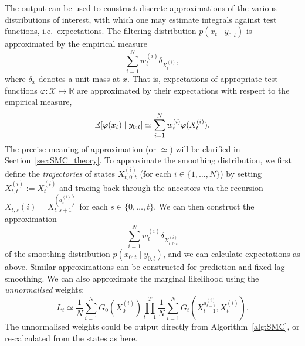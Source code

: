 The output can be used to construct discrete approximations of the various distributions of interest, with which one may estimate integrals against test functions, i.e.\ expectations.
The filtering distribution $p(x_t \mid y_{0:t})$ is approximated by the empirical measure
\begin{equation*}
\sum_{i=1}^N w_t^{(i)} \delta_{ X_t^{(i)} } ,
\end{equation*}
where $\delta_x$ denotes a unit mass at $x$.
That is, expectations of appropriate test functions $\varphi : \mathcal{X} \mapsto \mathbb{R}$ are approximated by their expectations with respect to the empirical measure,
\begin{equation*}
\mathbb{E}[ \varphi(x_t) \mid y_{0:t} ]
\simeq \sum_{i=1}^N w_t^{(i)} \varphi( X_t^{(i)} ) .
\end{equation*}
The precise meaning of approximation (or $\simeq$) will be clarified in Section~\ref{sec:SMC_theory}.
To approximate the smoothing distribution, we first define the \emph{trajectories} of states $X_{t,0:t}^{(i)}$ (for each $i \in \{1,\dots,N\}$) by setting $X_{t,t}^{(i)} := X_t^{(i)}$ and tracing back through the ancestors via the recursion $X_{t,s}{(i)} = X_{t,s+1}^{( a_t^{(i)} )}$ for each $s \in \{0,\dots, t\}$. 
We can then construct the approximation
\begin{equation*}
\sum_{i=1}^N w_t^{(i)} \delta_{ X_{t,0:t}^{(i)} } 
\end{equation*}
of the smoothing distribution $p(x_{0:t} \mid y_{0:t})$, and we can calculate expectations as above.
Similar approximations can be constructed for prediction and fixed-lag smoothing.
We can also approximate the marginal likelihood using the \emph{unnormalised} weights:
\begin{equation}\label{eq:likelihood_estimate}
L_t 
\simeq \frac{1}{N} \sum_{i=1}^N G_0(X_0^{(i)}) \prod_{t=1}^T \frac{1}{N}
        \sum_{i=1}^N G_t( X_{t-1}^{ a_{t-1}^{(i)} }, X_t^{(i)} ) .
\end{equation}
The unnormalised weights could be output directly from Algorithm~\ref{alg:SMC}, or re-calculated from the states as here.







